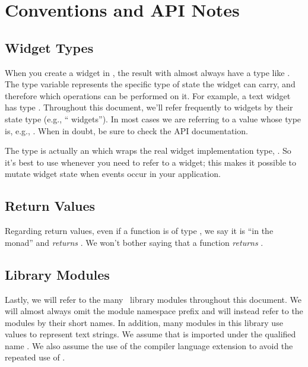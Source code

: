 \section{Conventions and API Notes}

\subsection{Widget Types}

When you create a widget in \vtyui, the result with almost always have
a type like .  The type variable  represents the
specific type of state the widget can carry, and therefore which
operations can be performed on it.  For example, a text widget has
type .  Throughout this document, we'll refer
frequently to widgets by their state type (e.g., ``
widgets''). In most cases we are referring to a value whose type is,
e.g., .  When in doubt, be sure to check the API
documentation.

The  type is actually an  which wraps the real
widget implementation type, .  So it's best to use
 whenever you need to refer to a widget; this makes it
possible to mutate widget state when events occur in your application.

\subsection{Return Values}

Regarding return values, even if a function is of type , we say it is ``in the  monad'' and \textit{returns}
.  We won't bother saying that a function \textit{returns }.

\subsection{Library Modules}

Lastly, we will refer to the many \vtyui\ library modules throughout
this document.  We will almost always omit the
 module namespace prefix and will instead
refer to the modules by their short names.  In addition, many modules
in this library use  values to represent text strings.
We assume that  is imported under the qualified name
.  We also assume the use of the  compiler
language extension to avoid the repeated use of .
